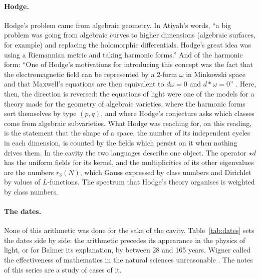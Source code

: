\documentclass[11pt]{article}
\begin{document}
\paragraph{Hodge.}
Hodge's problem came from algebraic geometry.
In Atiyah's words, ``a big problem was going from algebraic curves to higher dimensions (algebraic surfaces, for example) and replacing the holomorphic differentials. Hodge's great idea was using a Riemannian metric and taking harmonic forms.''
And of the harmonic form: ``One of Hodge's motivations for introducing this concept was the fact that the electromagnetic field can be represented by a 2-form $\omega$ in Minkowski space and that Maxwell's equations are then equivalent to $d\omega = 0$ and $d{*}\omega = 0$'' \cite{Atiyah}.
Here, then, the direction is reversed: the equations of light were one of the models for a theory made for the geometry of algebraic varieties, where the harmonic forms sort themselves by type $(p,q)$, and where Hodge's conjecture asks which classes come from algebraic subvarieties.
What Hodge was reaching for, on this reading, is the statement that the shape of a space, the number of its independent cycles in each dimension, is counted by the fields which persist on it when nothing drives them.
In the cavity the two languages describe one object.
The operator ${\star}d$ has the uniform fields for its kernel, and the multiplicities of its other eigenvalues are the numbers $r_3(N)$, which Gauss expressed by class numbers and Dirichlet by values of $L$-functions.
The spectrum that Hodge's theory organises is weighted by class numbers.

\paragraph{The dates.}
None of this arithmetic was done for the sake of the cavity.
Table~\ref{tab:dates} sets the dates side by side: the arithmetic precedes its appearance in the physics of light, or for Balmer its explanation, by between 28 and 165 years.
Wigner called the effectiveness of mathematics in the natural sciences unreasonable \cite{Wigner}.
The notes of this series are a study of cases of it.
\end{document}
